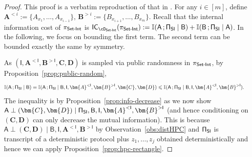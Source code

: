 \documentclass[11pt,letterpaper]{article}
\renewcommand{\leq}{\leqslant}
\theoremstyle{definition}
\newcommand{\Prot}{\ensuremath{\Pi}}
\newcommand{\prot}{\ensuremath{\pi}}
\newcommand{\bA}{\bm{A}}
\newcommand{\bB}{\ensuremath{\bm{B}}}
\newcommand{\bC}{\ensuremath{\bm{C}}}
\newcommand{\bD}{\ensuremath{\bm{D}}}
\newcommand{\rA}{\rv{A}}
\newcommand{\rB}{\rv{B}}
\newcommand{\rI}{\rv{I}}
\newcommand{\rv}[1]{\ensuremath{\mathsf{#1}}}
\newcommand{\II}{\ensuremath{\mathbb{I}}}
\newcommand{\mi}[2]{\ensuremath{\II(#1 \,; #2)}}
\newcommand{\rProtSI}{\ensuremath{\rv{\Prot}}_{\ensuremath{\textnormal{\textsf{SI}}}}\xspace}
\newcommand{\SI}{\ensuremath{\textnormal{\textsf{Set-Int}}}\xspace}
\newcommand{\ICost}[2]{\ensuremath{\textnormal{\textsf{IC}}_{#2}(#1)}\xspace}
\newcommand{\IC}[2]{\ICost{#1}{#2}}
\begin{document}
\begin{proof}
This proof is a verbatim reproduction of that in \cite{AssadiCK19}. For any $i \in [m]$, define $\bA^{<i} := \{A_{x_1},\ldots,A_{x_{i-1}}\}$, $\bB^{>i} := \{B_{x_{i+1}},\ldots,B_{x_{m}}\}$. Recall that 
the internal information cost of $\prot_\SI$ is $\IC{\prot_\SI}{\cD_\SI} := \mi{\rA}{\rProtSI \mid \rB} + \mi{\rB}{\rProtSI \mid \rA}$. In the following, we focus on bounding the first term. The second term can be bounded exactly
the same by symmetry.  

As $(\rI,\bA^{<\rI},\bB^{>\rI},\bC,\bD)$ is sampled via public randomness in $\prot_\SI$, by Proposition~\ref{prop:public-random},   
\begin{align*}
	\mi{\rA}{\rProtSI \mid \rB} &= \mi{\rA}{\rProtSI \mid \rB, \rI,\bA^{<\rI},\bB^{>\rI},\bC,\bD} \leq \mi{\rA}{\rProtSI \mid \rB, \rI,\bA^{<\rI},\bB^{>\rI}}. 
\end{align*}
The inequality is by Proposition~\ref{prop:info-decrease} as we now show $\rA \perp (\bC,\bD) \mid \rProtSI,\rB,\rI,\bA^{<\rI},\bB^{>\rI}$ (and hence conditioning on $(\bC,\bD)$ can only decrease the mutual information). 
This is because $\rA \perp (\bC,\bD) \mid \rB,\rI,\bA^{<\rI},\bB^{>\rI}$ by Observation~\ref{obs:distHPC} and $\rProtSI$ is transcript of a deterministic protocol plus $z_1,\ldots,z_j$ obtained deterministically and hence we can apply
Proposition~\ref{prop:hpc-rectangle}.  


\end{proof}
\end{document}
